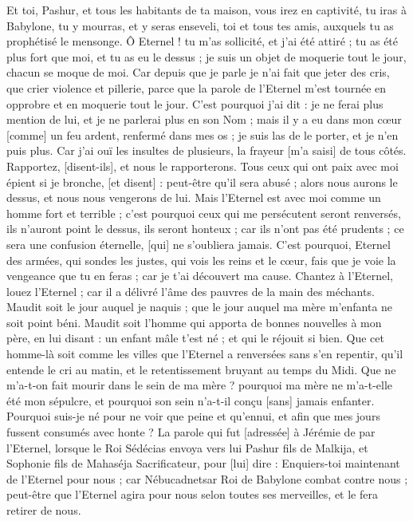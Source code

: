 \begin{multicols}{2}
Et toi, Pashur, et tous les habitants de ta maison, vous irez en captivité, tu iras à Babylone, tu y mourras, et y seras enseveli, toi et tous tes amis, auxquels tu as prophétisé le mensonge.
Ô Eternel ! tu m'as sollicité, et j'ai été attiré ; tu as été plus fort que moi, et tu as eu le dessus ; je suis un objet de moquerie tout le jour, chacun se moque de moi.
Car depuis que je parle je n'ai fait que jeter des cris, que crier violence et pillerie, parce que la parole de l'Eternel m'est tournée en opprobre et en moquerie tout le jour.
C'est pourquoi j'ai dit : je ne ferai plus mention de lui, et je ne parlerai plus en son Nom ; mais il y a eu dans mon cœur [comme] un feu ardent, renfermé dans mes os ; je suis las de le porter, et je n'en puis plus.
Car j'ai ouï les insultes de plusieurs, la frayeur [m'a saisi] de tous côtés. Rapportez, [disent-ils], et nous le rapporterons. Tous ceux qui ont paix avec moi épient si je bronche, [et disent] : peut-être qu'il sera abusé ; alors nous aurons le dessus, et nous nous vengerons de lui.
Mais l'Eternel est avec moi comme un homme fort et terrible ; c'est pourquoi ceux qui me persécutent seront renversés, ils n'auront point le dessus, ils seront honteux ; car ils n'ont pas été prudents ; ce sera une confusion éternelle, [qui] ne s'oubliera jamais.
C'est pourquoi, Eternel des armées, qui sondes les justes, qui vois les reins et le cœur, fais que je voie la vengeance que tu en feras ; car je t'ai découvert ma cause.
Chantez à l'Eternel, louez l'Eternel ; car il a délivré l'âme des pauvres de la main des méchants.
Maudit soit le jour auquel je naquis ; que le jour auquel ma mère m'enfanta ne soit point béni.
Maudit soit l'homme qui apporta de bonnes nouvelles à mon père, en lui disant : un enfant mâle t'est né ; et qui le réjouit si bien.
Que cet homme-là soit comme les villes que l'Eternel a renversées sans s'en repentir, qu'il entende le cri au matin, et le retentissement bruyant au temps du Midi.
Que ne m'a-t-on fait mourir dans le sein de ma mère ? pourquoi ma mère ne m'a-t-elle été mon sépulcre, et pourquoi son sein n'a-t-il conçu [sans] jamais enfanter.
Pourquoi suis-je né pour ne voir que peine et qu'ennui, et afin que mes jours fussent consumés avec honte ?
\VerseOne{}La parole qui fut [adressée] à Jérémie de par l'Eternel, lorsque le Roi Sédécias envoya vers lui Pashur fils de Malkija, et Sophonie fils de Mahaséja Sacrificateur, pour [lui] dire :
Enquiers-toi maintenant de l'Eternel pour nous ; car Nébucadnetsar Roi de Babylone combat contre nous ; peut-être que l'Eternel agira pour nous selon toutes ses merveilles, et le fera retirer de nous.

\end{multicols}
